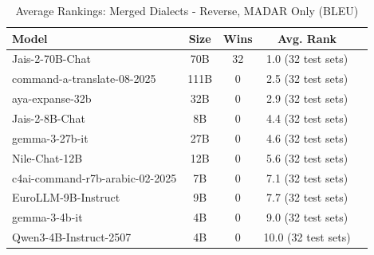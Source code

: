 \begin{table}[htbp]
\centering
\caption{Average Rankings: Merged Dialects - Reverse, MADAR Only (BLEU)}
\label{tab:avg_rankings_bleu}
\begin{tabular}{l@{\hspace{3pt}}c@{\hspace{3pt}}c@{\hspace{3pt}}c@{\hspace{3pt}}c}
\toprule
Model & Size & Wins & Avg. Rank \\
\midrule
Jais-2-70B-Chat & 70B & 32 & 1.0 (32 test sets) \\
command-a-translate-08-2025 & 111B & 0 & 2.5 (32 test sets) \\
aya-expanse-32b & 32B & 0 & 2.9 (32 test sets) \\
Jais-2-8B-Chat & 8B & 0 & 4.4 (32 test sets) \\
gemma-3-27b-it & 27B & 0 & 4.6 (32 test sets) \\
Nile-Chat-12B & 12B & 0 & 5.6 (32 test sets) \\
c4ai-command-r7b-arabic-02-2025 & 7B & 0 & 7.1 (32 test sets) \\
EuroLLM-9B-Instruct & 9B & 0 & 7.7 (32 test sets) \\
gemma-3-4b-it & 4B & 0 & 9.0 (32 test sets) \\
Qwen3-4B-Instruct-2507 & 4B & 0 & 10.0 (32 test sets) \\
\bottomrule
\end{tabular}
\end{table}